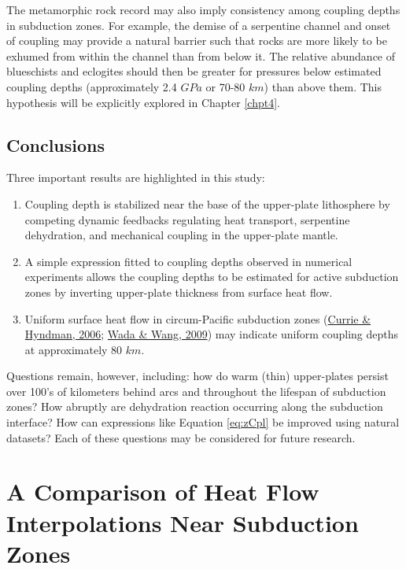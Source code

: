 The metamorphic rock record may also imply consistency among coupling depths in subduction zones. For example, the demise of a serpentine channel and onset of coupling may provide a natural barrier such that rocks are more likely to be exhumed from within the channel than from below it. The relative abundance of blueschists and eclogites should then be greater for pressures below estimated coupling depths (approximately 2.4 \(GPa\) or 70-80 \(km\)) than above them. This hypothesis will be explicitly explored in Chapter \ref{chpt4}.

\hypertarget{conclusions}{%
\section{Conclusions}\label{conclusions}}

Three important results are highlighted in this study:

\begin{enumerate}
\def\labelenumi{\arabic{enumi}.}
\item
  Coupling depth is stabilized near the base of the upper-plate lithosphere by competing dynamic feedbacks regulating heat transport, serpentine dehydration, and mechanical coupling in the upper-plate mantle.
\item
  A simple expression fitted to coupling depths observed in numerical experiments allows the coupling depths to be estimated for active subduction zones by inverting upper-plate thickness from surface heat flow.
\item
  Uniform surface heat flow in circum-Pacific subduction zones (\protect\hyperlink{ref-currie2006}{Currie \& Hyndman, 2006}; \protect\hyperlink{ref-wada2009}{Wada \& Wang, 2009}) may indicate uniform coupling depths at approximately 80 \(km\).
\end{enumerate}

Questions remain, however, including: how do warm (thin) upper-plates persist over 100's of kilometers behind arcs and throughout the lifespan of subduction zones? How abruptly are dehydration reaction occurring along the subduction interface? How can expressions like Equation \eqref{eq:zCpl} be improved using natural datasets? Each of these questions may be considered for future research.

\cleardoublepage

\hypertarget{chpt3}{%
\chapter{A Comparison of Heat Flow Interpolations Near Subduction Zones}\label{chpt3}}


